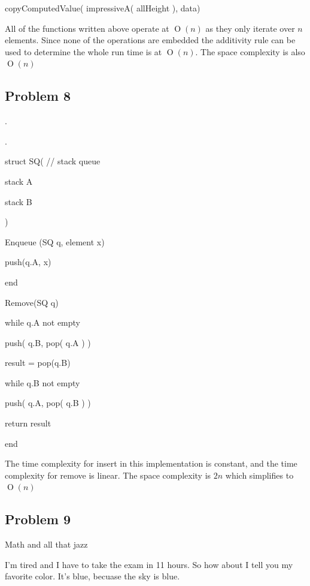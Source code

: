 \documentclass[10pt,letterpaper,oneside]{article}
\newcommand{\Problem}[1]{\subsection*{Problem #1}}
\DeclareMathOperator{\Omicron}{O}
\newcommand{\BigOh}[1]{\Omicron(#1)}
\newcommand\tab[1][1cm]{\hspace*{#1}}
\begin{document}
\tab copyComputedValue( impressiveA( allHeight ), data)


All of the functions written above operate at  $\BigOh{n}$ as they only iterate over $n$ elements. Since none of the operations are embedded the additivity rule can be used to determine the whole run time is at  $\BigOh{n}$. The space complexity is also  $\BigOh{n}$

\Problem{8}

.

.

struct SQ( // stack queue

\tab stack A

\tab stack B

)

Enqueue (SQ q, element x)

\tab push(q.A, x)

end

Remove(SQ q)

\tab while q.A not empty

\tab\tab push( q.B, pop( q.A ) )

\tab result = pop(q.B)

\tab while q.B not empty

\tab\tab push( q.A, pop( q.B ) )

\tab return result

end

The time complexity for insert in this implementation is constant, and the time complexity for remove is linear. The space complexity is $2n$ which simplifies to  $\BigOh{n}$

\Problem{9}

Math and all that jazz

I'm tired and I have to take the exam in 11 hours. So how about I tell you my favorite color. It's blue, becuase the sky is blue.
\end{document}
